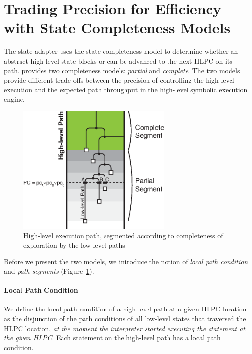 
\section{Trading Precision for Efficiency with State Completeness Models}
\label{sec:chef:completeness-models}

The state adapter uses the state completeness model to determine whether an abstract high-level state blocks or can be advanced to the next HLPC on its path.
%
\chef provides two completeness models: \emph{partial} and \emph{complete}.
%
The two models provide different trade-offs between the precision of controlling the high-level execution and the expected path throughput in the high-level symbolic execution engine.

\begin{figure}
  \centering
  \includegraphics[width=3in]{figures/chef/path-segments}
  \caption{High-level execution path, segmented according to completeness of exploration by the low-level paths.}
  \label{fig:chef:path-segments}
\end{figure}

Before we present the two models, we introduce the notion of \emph{local path condition} and \emph{path segments} (Figure~\ref{fig:chef:path-segments}).

\paragraph{Local Path Condition}

We define the local path condition of a high-level path at a given HLPC location as the disjunction of the path conditions of all low-level states that traversed the HLPC location, \emph{at the moment the interpreter started executing the statement at the given HLPC}.
%
Each statement on the high-level path has a local path condition.

